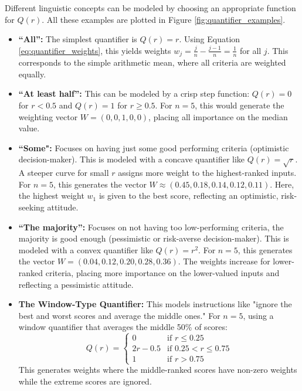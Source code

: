 \begin{example}
    Different linguistic concepts can be modeled by choosing an appropriate function for $Q(r)$. All these examples are plotted in Figure \ref{fig:quantifier_examples}.
    \begin{itemize}
        \item \textbf{``All'':} The simplest quantifier is $Q(r) = r$. Using Equation \ref{eq:quantifier_weights}, this yields weights $w_j = \frac{j}{n} - \frac{j-1}{n} = \frac{1}{n}$ for all $j$. This corresponds to the simple arithmetic mean, where all criteria are weighted equally.
        \item \textbf{``At least half'':} This can be modeled by a crisp step function: $Q(r) = 0$ for $r < 0.5$ and $Q(r) = 1$ for $r \ge 0.5$. For $n=5$, this would generate the weighting vector $W=(0, 0, 1, 0, 0)$, placing all importance on the median value.
        \item \textbf{``Some":} Focuses on having just some good performing criteria (optimistic decision-maker). This is modeled with a concave quantifier like $Q(r) = \sqrt{r}$. A steeper curve for small $r$ assigns more weight to the highest-ranked inputs. For $n=5$, this generates the vector $W \approx (0.45, 0.18, 0.14, 0.12, 0.11)$. Here, the highest weight $w_1$ is given to the best score, reflecting an optimistic, risk-seeking attitude.

        \item \textbf{``The majority'':} Focuses on not having too low-performing criteria, the majority is good enough (pessimistic or risk-averse decision-maker). This is modeled with a convex quantifier like $Q(r) = r^2$. For $n=5$, this generates the vector $W=(0.04, 0.12, 0.20, 0.28, 0.36)$. The weights increase for lower-ranked criteria, placing more importance on the lower-valued inputs and reflecting a pessimistic attitude.
        
        \item \textbf{The Window-Type Quantifier:} This models instructions like "ignore the best and worst scores and average the middle ones." For $n=5$, using a window quantifier that averages the middle 50\% of scores:
        \[ Q(r) = \begin{cases} 0 & \text{if } r \le 0.25 \\ 2r - 0.5 & \text{if } 0.25 < r \le 0.75 \\ 1 & \text{if } r > 0.75 \end{cases} \]
        This generates weights where the middle-ranked scores have non-zero weights while the extreme scores are ignored.
    \end{itemize}
    \end{example}


